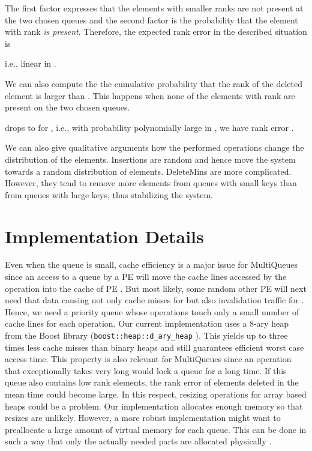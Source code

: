 \documentclass[a4paper,12pt]{article}
\begin{document}
The first factor expresses that the  elements with smaller ranks are not present at the two chosen queues and the second factor is the probability that the element with rank  \emph{is present}. 
Therefore, the expected rank error in the described situation is  

i.e., linear in . 


We can also compute the the cumulative probability that the rank of the deleted element is larger than . This happens when none of the  elements with rank  are present on the two chosen queues. 

 drops to 
 for , i.e., with probability polynomially large in , we have rank error  .


We can also give qualitative arguments how the performed operations change the distribution of the elements. Insertions are random and hence move the system towards a random distribution of elements. DeleteMins are more complicated. 
However, they tend to remove more elements from queues with small keys than from queues with large keys, thus stabilizing the system. 



\section{Implementation Details}
\label{s:implementation}

Even when the queue is small, cache efficiency is a major issue for MultiQueues since an access to a queue  by a PE  will move the cache lines accessed by the operation into the cache of PE . But most likely, some random other PE  will next need that data causing not only cache misses for  but also invalidation traffic for . Hence, we need a priority queue whose operations touch only a small number of cache lines for each operation. Our current implementation uses a 8-ary heap from the Boost library ({\tt boost::heap::d\_ary\_heap} \cite{schling2011boost}). This yields up to three times less cache misses than binary heaps and still guarantees efficient worst case access time. This property is also relevant for MultiQueues since an operation that exceptionally takes very long would lock a queue for a long time.  If this queue also contains low rank elements, the rank error of elements deleted in the mean time could become large. In this respect, resizing operations for array based heaps could be a problem. Our implementation allocates enough memory so that resizes are unlikely. However, a more robust implementation might want to preallocate a large amount of virtual memory for each queue. This can be done in such a way that only the actually needed parts are allocated physically \cite{SanWas11}. 
\end{document}
